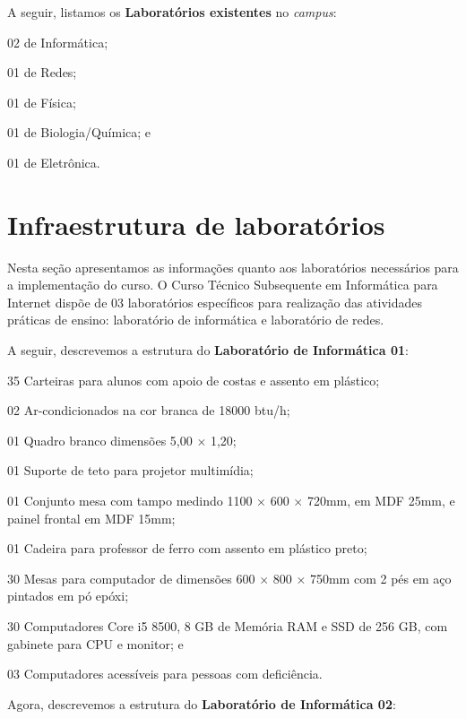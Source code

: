 \documentclass[
	12pt,				%
	openright,			%
	twoside,			%
	a4paper,			%
	chapter=TITLE,		%
	english,			%
	french,				%
	spanish,			%
	brazil,				%
	]{abntex2}
\begin{document}
A seguir, listamos os \textbf{Laboratórios existentes}  no \textit{campus}:
\begin{alineas}
	\item 02 de Informática;
	\item 01 de Redes;
	\item 01 de Física;
	\item 01 de Biologia/Química; e
	\item 01 de Eletrônica.
\end{alineas}


\section{Infraestrutura de laboratórios}\label{labs-info}

Nesta seção apresentamos as informações quanto aos laboratórios necessários para a implementação do
curso. O Curso Técnico Subsequente em Informática para Internet dispõe de 03 laboratórios específicos para realização das atividades práticas de ensino: laboratório de informática e laboratório de redes.

A seguir, descrevemos a estrutura do \textbf{Laboratório de Informática 01}:
\begin{alineas}
	\item 35 Carteiras para alunos com apoio de costas e assento em plástico;
	\item 02 Ar-condicionados na cor branca de 18000 btu/h;
	\item 01 Quadro branco dimensões 5,00 $\times$ 1,20;
	\item 01 Suporte de teto para projetor multimídia;
	\item 01 Conjunto mesa com tampo medindo 1100  $\times$ 600  $\times$ 720mm, em MDF 25mm, e painel frontal em MDF 15mm;
\item 01 Cadeira para professor de ferro com assento em plástico preto;
\item 30 Mesas para computador de dimensões 600  $\times$ 800  $\times$ 750mm com 2 pés em aço pintados em pó epóxi;
\item 30 Computadores Core i5 8500, 8 GB de Memória RAM e SSD de 256 GB,
com gabinete para CPU e monitor; e
\item 03 Computadores acessíveis para pessoas com deficiência.
\end{alineas}


Agora, descrevemos a estrutura do \textbf{Laboratório de Informática 02}:
\end{document}
